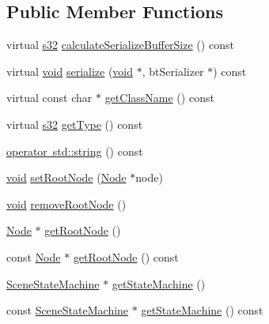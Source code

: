 \subsection*{Public Member Functions}
\begin{DoxyCompactItemize}
\item 
virtual \mbox{\hyperlink{_util_8h_aa62c75d314a0d1f37f79c4b73b2292e2}{s32}} \mbox{\hyperlink{classnjli_1_1_scene_aca382ffb528d7cb055a4b3cf09545050}{calculate\+Serialize\+Buffer\+Size}} () const
\item 
virtual \mbox{\hyperlink{_thread_8h_af1e856da2e658414cb2456cb6f7ebc66}{void}} \mbox{\hyperlink{classnjli_1_1_scene_a09f66453d56234e0c2e7d85116b8d6d6}{serialize}} (\mbox{\hyperlink{_thread_8h_af1e856da2e658414cb2456cb6f7ebc66}{void}} $\ast$, bt\+Serializer $\ast$) const
\item 
virtual const char $\ast$ \mbox{\hyperlink{classnjli_1_1_scene_acc03bc01043d647c64d512abd9fd44e3}{get\+Class\+Name}} () const
\item 
virtual \mbox{\hyperlink{_util_8h_aa62c75d314a0d1f37f79c4b73b2292e2}{s32}} \mbox{\hyperlink{classnjli_1_1_scene_aac1c30b93e02095431fbc7a2739269e3}{get\+Type}} () const
\item 
\mbox{\hyperlink{classnjli_1_1_scene_a264f0ffff37c50ec083d14305484d33c}{operator std\+::string}} () const
\item 
\mbox{\hyperlink{_thread_8h_af1e856da2e658414cb2456cb6f7ebc66}{void}} \mbox{\hyperlink{classnjli_1_1_scene_a3118fbf195018c52cc493efdec177f9e}{set\+Root\+Node}} (\mbox{\hyperlink{classnjli_1_1_node}{Node}} $\ast$node)
\item 
\mbox{\hyperlink{_thread_8h_af1e856da2e658414cb2456cb6f7ebc66}{void}} \mbox{\hyperlink{classnjli_1_1_scene_ae29659499a79266189dbed583e262873}{remove\+Root\+Node}} ()
\item 
\mbox{\hyperlink{classnjli_1_1_node}{Node}} $\ast$ \mbox{\hyperlink{classnjli_1_1_scene_a6bb6c79820215734862915f282c08058}{get\+Root\+Node}} ()
\item 
const \mbox{\hyperlink{classnjli_1_1_node}{Node}} $\ast$ \mbox{\hyperlink{classnjli_1_1_scene_a9b9405d1a8582835baabce12fdcd8c1c}{get\+Root\+Node}} () const
\item 
\mbox{\hyperlink{classnjli_1_1_scene_state_machine}{Scene\+State\+Machine}} $\ast$ \mbox{\hyperlink{classnjli_1_1_scene_affbc7b7b0c3ad6bc2cba663e4359fc2d}{get\+State\+Machine}} ()
\item 
const \mbox{\hyperlink{classnjli_1_1_scene_state_machine}{Scene\+State\+Machine}} $\ast$ \mbox{\hyperlink{classnjli_1_1_scene_a8975e7ec684eaea3563acd6c10f50814}{get\+State\+Machine}} () const

\end{DoxyCompactItemize}
